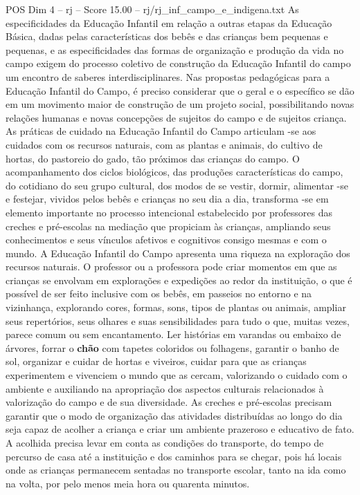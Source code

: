 \begin{textsample}{POS Dim 4 – rj – Score 15.00 – rj/rj\_inf\_campo\_e\_indigena.txt}
As especificidades da Educação Infantil em relação a outras etapas da Educação Básica, dadas pelas características dos bebês e das crianças bem pequenas e pequenas, e as especificidades das formas de organização e produção da vida no campo exigem do processo coletivo de construção da Educação Infantil do campo um encontro de saberes interdisciplinares.
Nas propostas pedagógicas para a Educação Infantil do Campo, é preciso considerar que o geral e o específico se dão em um movimento maior de construção de um projeto social, possibilitando novas relações humanas e novas concepções de sujeitos do campo e de sujeitos criança.
As práticas de cuidado na Educação Infantil do Campo articulam -se aos cuidados com os recursos naturais, com as plantas e animais, do cultivo de hortas, do pastoreio do gado, tão próximos das crianças do campo.
O acompanhamento dos ciclos biológicos, das produções características do campo, do cotidiano do seu grupo cultural, dos modos de se vestir, dormir, alimentar -se e festejar, vividos pelos bebês e crianças no seu dia a dia, transforma -se em elemento importante no processo intencional estabelecido por professores das creches e pré-escolas na mediação que propiciam às crianças, ampliando seus conhecimentos e seus vínculos afetivos e cognitivos consigo mesmas e com o mundo.
A Educação Infantil do Campo apresenta uma riqueza na exploração dos recursos naturais.
O professor ou a professora pode criar momentos em que as crianças se envolvam em explorações e expedições ao redor da instituição, o que é possível de ser feito inclusive com os bebês, em passeios no entorno e na vizinhança, explorando cores, formas, sons, tipos de plantas ou animais, ampliar seus repertórios, seus olhares e suas sensibilidades para tudo o que, muitas vezes, parece comum ou sem encantamento.
Ler histórias em varandas ou embaixo de árvores, forrar o \textbf{chão} com tapetes coloridos ou folhagens, garantir o banho de sol, organizar e cuidar de hortas e viveiros, cuidar para que as crianças experimentem e vivenciem o mundo que as cercam, valorizando o cuidado com o ambiente e auxiliando na apropriação dos aspectos culturais relacionados à valorização do campo e de sua diversidade.
As creches e pré-escolas precisam garantir que o modo de organização das atividades distribuídas ao longo do dia seja capaz de acolher a criança e criar um ambiente prazeroso e educativo de fato.
A acolhida precisa levar em conta as condições do transporte, do tempo de percurso de casa até a instituição e dos caminhos para se chegar, pois há locais onde as crianças permanecem sentadas no transporte escolar, tanto na ida como na volta, por pelo menos meia hora ou quarenta minutos.

\end{textsample}
